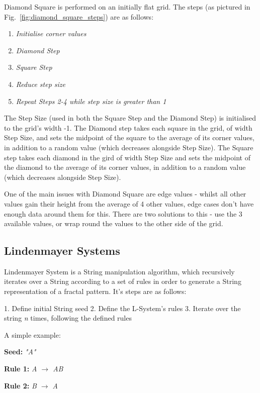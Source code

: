 \documentclass[a4paper,10pt]{report}
\begin{document}
Diamond Square is performed on an initially flat grid. The steps (as pictured in Fig.~\ref{fig:diamond_square_steps}) are as follows:

\begin{enumerate}
\item \textit{Initialise corner values}
\item \textit{Diamond Step}
\item \textit{Square Step}
\item \textit{Reduce step size} 
\item \textit{Repeat Steps 2-4 while step size is greater than 1}
\end{enumerate} 

The Step Size (used in both the Square Step and the Diamond Step) is initialised to the grid's width -1. The Diamond step takes each square in the grid, of width Step Size, and sets the midpoint of the square to the average of its corner values, in addition to a random value (which decreases alongside Step Size). The Square step takes each diamond in the gird of width Step Size and sets the midpoint of the diamond to the average of its corner values, in addition to a random value (which decreases alongside Step Size). \medskip

One of the main issues with Diamond Square are edge values - whilst all other values gain their height from the average of 4 other values, edge cases don't have enough data around them for this. There are two solutions to this - use the 3 available values, or wrap round the values to the other side of the grid. 

\subsection{Lindenmayer Systems}

Lindenmayer System is a String manipulation algorithm, which recursively iterates over a String according to a set of rules in order to generate a String representation of a fractal pattern. It's steps are as follows:


1. Define initial String seed
2. Define the L-System's rules
3. Iterate over the string \textit{n} times, following the defined rules


A simple example:\medskip

\textbf{Seed:} \textit{"A"}

\textbf{Rule 1:} \textit{A $\rightarrow$ AB}

\textbf{Rule 2:} \textit{B $\rightarrow$ A}
\end{document}
